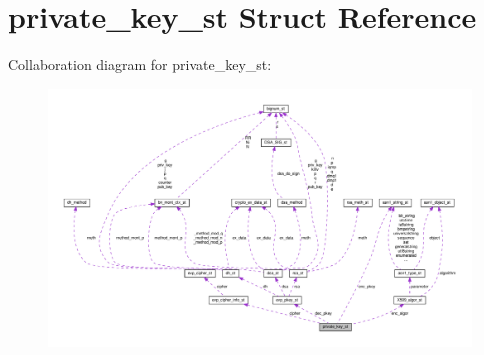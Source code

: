 \hypertarget{structprivate__key__st}{}\section{private\+\_\+key\+\_\+st Struct Reference}
\label{structprivate__key__st}


Collaboration diagram for private\+\_\+key\+\_\+st\+:
\nopagebreak
\begin{figure}[H]
\begin{center}
\leavevmode
\includegraphics[width=350pt]{structprivate__key__st__coll__graph}
\end{center}
\end{figure}
